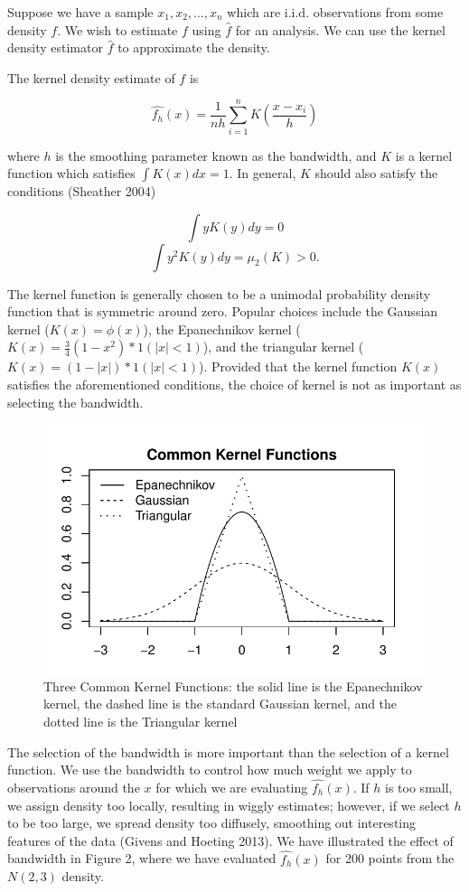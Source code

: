 \documentclass[]{article}
\begin{document}
Suppose we have a sample \(x_1, x_2, \ldots, x_n\) which are i.i.d.
observations from some density \(f\). We wish to estimate \(f\) using
\(\hat{f}\) for an analysis. We can use the kernel density estimator
\(\hat{f}\) to approximate the density.

The kernel density estimate of \(f\) is

\[\widehat{f_h}(x) = \frac{1}{nh} \sum_{i = 1}^{n}K\left(\frac{x - x_i}{h}\right) \]

where \(h\) is the smoothing parameter known as the bandwidth, and \(K\)
is a kernel function which satisfies \(\int{K(x)dx} = 1\). In general,
\(K\) should also satisfy the conditions (Sheather 2004)

\[\int{yK(y)dy} = 0\] \[\int{y^2K(y)dy} = \mu_2(K) > 0.\]

The kernel function is generally chosen to be a unimodal probability
density function that is symmetric around zero. Popular choices include
the Gaussian kernel (\(K(x) = \phi(x)\)), the Epanechnikov kernel
(\(K(x) = \frac{3}{4}(1-x^2)*1(|x| <1)\)), and the triangular kernel
(\(K(x) = (1 - |x|)*1(|x| < 1)\)). Provided that the kernel function
\(K(x)\) satisfies the aforementioned conditions, the choice of kernel
is not as important as selecting the bandwidth.

\begin{figure}[htbp]
\centering
\includegraphics{FinalReport_files/figure-latex/unnamed-chunk-2-1.pdf}
\caption{Three Common Kernel Functions: the solid line is the
Epanechnikov kernel, the dashed line is the standard Gaussian kernel,
and the dotted line is the Triangular kernel}
\end{figure}

The selection of the bandwidth is more important than the selection of a
kernel function. We use the bandwidth to control how much weight we
apply to observations around the \(x\) for which we are evaluating
\(\widehat{f_h}(x)\). If \(h\) is too small, we assign density too
locally, resulting in wiggly estimates; however, if we select \(h\) to
be too large, we spread density too diffusely, smoothing out interesting
features of the data (Givens and Hoeting 2013). We have illustrated the
effect of bandwidth in Figure 2, where we have evaluated
\(\widehat{f_h}(x)\) for 200 points from the \(N(2, 3)\) density.
\end{document}

